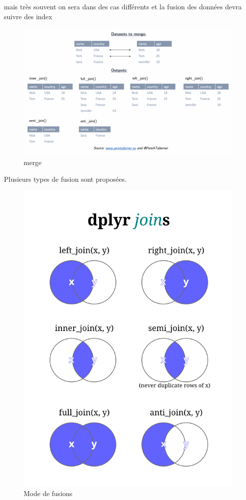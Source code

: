 \documentclass[
]{book}
\begin{document}
mais très souvent on sera dans des cas différents et la fusion des données devra suivre des index

\begin{figure}
\centering
\includegraphics{./Images/merge_ex-1024x624.png}
\caption{merge}
\end{figure}

Plusieurs types de fusion sont proposées.

\begin{figure}
\centering
\includegraphics{./Images/join_diagram.png}
\caption{Mode de fusions}
\end{figure}
\end{document}
